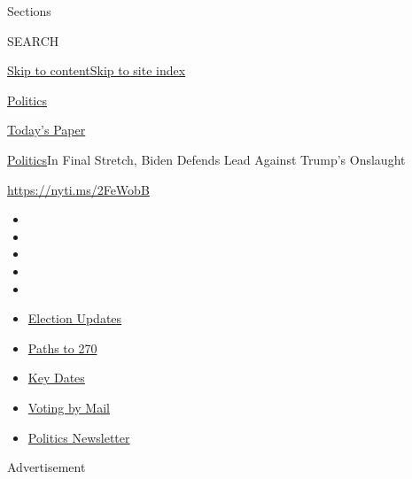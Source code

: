 Sections

SEARCH

\protect\hyperlink{site-content}{Skip to
content}\protect\hyperlink{site-index}{Skip to site index}

\href{https://www.nytimes3xbfgragh.onion/section/politics}{Politics}

\href{https://myaccount.nytimes3xbfgragh.onion/auth/login?response_type=cookie\&client_id=vi}{}

\href{https://www.nytimes3xbfgragh.onion/section/todayspaper}{Today's
Paper}

\href{/section/politics}{Politics}\textbar{}In Final Stretch, Biden
Defends Lead Against Trump's Onslaught

\url{https://nyti.ms/2FeWobB}

\begin{itemize}
\item
\item
\item
\item
\item
\end{itemize}

\begin{itemize}
\item
  \href{https://www.nytimes3xbfgragh.onion/live/2020/09/11/us/trump-vs-biden?action=click\&pgtype=Article\&state=default\&region=TOP_BANNER\&context=storylines_menu}{Election
  Updates}
\item
  \href{https://www.nytimes3xbfgragh.onion/interactive/2020/us/elections/election-states-biden-trump.html?action=click\&pgtype=Article\&state=default\&region=TOP_BANNER\&context=storylines_menu}{Paths
  to 270}
\item
  \href{https://www.nytimes3xbfgragh.onion/interactive/2019/us/elections/2020-presidential-election-calendar.html?action=click\&pgtype=Article\&state=default\&region=TOP_BANNER\&context=storylines_menu}{Key
  Dates}
\item
  \href{https://www.nytimes3xbfgragh.onion/interactive/2020/08/31/us/politics/vote-by-mail-deadlines.html?action=click\&pgtype=Article\&state=default\&region=TOP_BANNER\&context=storylines_menu}{Voting
  by Mail}
\item
  \href{https://www.nytimes3xbfgragh.onion/newsletters/politics?action=click\&pgtype=Article\&state=default\&region=TOP_BANNER\&context=storylines_menu}{Politics
  Newsletter}
\end{itemize}

Advertisement


